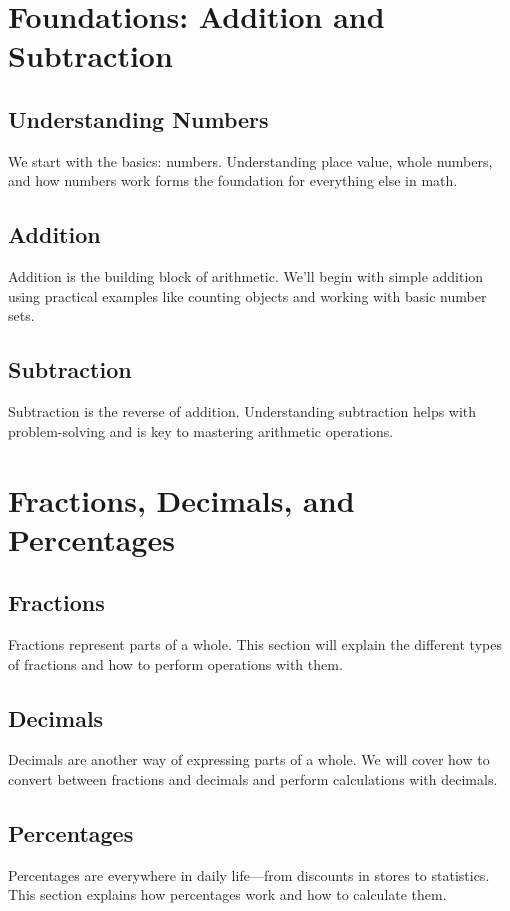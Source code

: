 \documentclass{book}
\begin{document}
\chapter{Foundations: Addition and Subtraction}
\section{Understanding Numbers}
We start with the basics: numbers. Understanding place value, whole numbers, and how numbers work forms the foundation for everything else in math.

\section{Addition}
Addition is the building block of arithmetic. We’ll begin with simple addition using practical examples like counting objects and working with basic number sets.

\section{Subtraction}
Subtraction is the reverse of addition. Understanding subtraction helps with problem-solving and is key to mastering arithmetic operations.

\chapter{Fractions, Decimals, and Percentages}
\section{Fractions}
Fractions represent parts of a whole. This section will explain the different types of fractions and how to perform operations with them.

\section{Decimals}
Decimals are another way of expressing parts of a whole. We will cover how to convert between fractions and decimals and perform calculations with decimals.

\section{Percentages}
Percentages are everywhere in daily life—from discounts in stores to statistics. This section explains how percentages work and how to calculate them.
\end{document}
